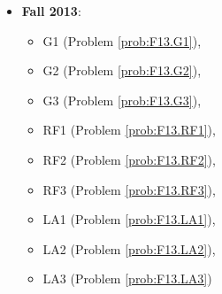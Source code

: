 \documentclass{article}
\theoremstyle{definition}
\begin{document}
\begin{itemize}
\item \textbf{Fall 2013}:  
	\begin{itemize}
	\item G1 (Problem \ref{prob:F13.G1}), 
	\item G2 (Problem \ref{prob:F13.G2}), 
	\item G3 (Problem \ref{prob:F13.G3}),
	\item RF1 (Problem \ref{prob:F13.RF1}),
	\item RF2 (Problem \ref{prob:F13.RF2}),
	\item RF3 (Problem \ref{prob:F13.RF3}),
	\item LA1 (Problem \ref{prob:F13.LA1}),
	\item LA2 (Problem \ref{prob:F13.LA2}),
	\item LA3 (Problem \ref{prob:F13.LA3})	
	\end{itemize}	
\end{itemize}


















\end{document}
